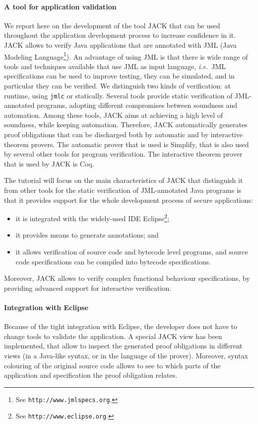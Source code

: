 \documentclass[]{llncs}
\begin{document}
\paragraph{A tool for application validation}
We report here on the development of the tool JACK that can be used
throughout the application development process to increase confidence
in it. JACK allows to verify Java applications that are annotated with
JML (Java Modeling Language\footnote{See
\texttt{http://www.jmlspecs.org}.}). An advantage of using JML is that
there is wide range of tools and techniques available that use JML as
input language, \emph{i.e.}\ JML specifications can be used to improve
testing, they can be simulated, and in particular they can be
verified. We distinguish two kinds of verification: at runtime, using
\texttt{jmlc} or statically. Several tools provide
static verification of JML-annotated programs, adopting different
compromises between soundness and automation.  Among these tools, JACK
aims at achieving a high level of soundness, while keeping
automation. Therefore, JACK automatically generates proof obligations
that can be discharged both by automatic and by interactive theorem
provers. The automatic prover that is used is Simplify, that is also
used by several other tools for program verification. The interactive
theorem prover that is used by JACK is Coq. 

The tutorial will focus on the main characteristics of JACK that
distinguish it from other tools for the static verification of
JML-annotated Java programs is that it provides support for the whole
development process of secure applications:
\begin{itemize}
\item it is integrated with the widely-used IDE Eclipse\footnote{See
\texttt{http://www.eclipse.org}.};
\item it provides means to generate annotations; and
\item it allows verification of source code and bytecode level
programs, and source code specifications can be compiled into bytecode
specifications.
\end{itemize}
Moreover, JACK allows to verify complex functional behaviour
specifications, by providing advanced support for interactive
verification. 


\paragraph{Integration with Eclipse}
Because of the tight integration with Eclipse, the developer does not
have to change tools to validate the application. A special JACK view
has been implemented, that allow to inspect the generated proof
obligations in different views (in a Java-like syntax, or in the
language of the prover). Moreover, syntax colouring of the original
source code allows to see to which parts of the application and
specification the proof obligation relates.
\end{document}
